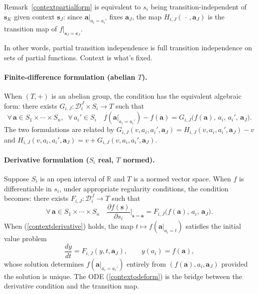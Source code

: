 \documentclass{article}
\theoremstyle{definition}
\theoremstyle{remark}
\begin{document}
\noindent Remark~\ref{contextpartialform} is equivalent to $s_i$ being transition-independent of $\boldsymbol{s}_K$ given context $\boldsymbol{s}_J$: since $\boldsymbol{a}|_{a_i = a_i'}$ fixes $\boldsymbol{a}_J$, the map $H_{i,J}(\,\cdot\,, \boldsymbol{a}_J)$ is the transition map of $f|_{\boldsymbol{s}_J = \boldsymbol{c}_J}$.

\medskip

\noindent In other words, partial transition independence is full transition independence on sets of partial functions. Context is what's fixed.

\paragraph{Finite-difference formulation (abelian $T$).} When $(T, +)$ is an abelian group, the condition has the equivalent algebraic form: there exists $G_{i,J} \colon \mathcal{D}_i^J \times S_i \to T$ such that
\begin{equation}
\label{contextfinitedifference}
\forall\, \boldsymbol{a} \in S_1 \times \cdots \times S_n,\;\; \forall\, a_i' \in S_i \quad
f(\boldsymbol{a}|_{a_i = a_i'}) - f(\boldsymbol{a}) = G_{i,J}\bigl(f(\boldsymbol{a}),\, a_i,\, a_i',\, \boldsymbol{a}_J\bigr).
\end{equation}
The two formulations are related by $G_{i,J}(v, a_i, a_i', \boldsymbol{a}_J) = H_{i,J}(v, a_i, a_i', \boldsymbol{a}_J) - v$ and $H_{i,J}(v, a_i, a_i', \boldsymbol{a}_J) = v + G_{i,J}(v, a_i, a_i', \boldsymbol{a}_J)$.

\paragraph{Derivative formulation ($S_i$ real, $T$ normed).} Suppose $S_i$ is an open interval of $\mathbb{R}$ and $T$ is a normed vector space. When $f$ is differentiable in $s_i$, under appropriate regularity conditions, the condition becomes: there exists $F_{i,J} \colon \mathcal{D}_i^J \to T$ such that
\begin{equation}
\label{contextderivative}
\forall\, \boldsymbol{a} \in S_1 \times \cdots \times S_n \quad
\frac{\partial f(\boldsymbol{s})}{\partial s_i}\bigg|_{\boldsymbol{s} = \boldsymbol{a}} = F_{i,J}\bigl(f(\boldsymbol{a}),\, a_i,\, \boldsymbol{a}_J\bigr).
\end{equation}
When (\ref{contextderivative}) holds, the map $t \mapsto f(\boldsymbol{a}|_{a_i = t})$ satisfies the initial value problem
\begin{equation}
\label{contextodeform}
\frac{dy}{dt} = F_{i,J}(y, t, \boldsymbol{a}_J), \qquad y(a_i) = f(\boldsymbol{a}),
\end{equation}
whose solution determines $f(\boldsymbol{a}|_{a_i = a_i'})$ entirely from $(f(\boldsymbol{a}), a_i, \boldsymbol{a}_J)$ provided the solution is unique. The ODE (\ref{contextodeform}) is the bridge between the derivative condition and the transition map.
\end{document}
